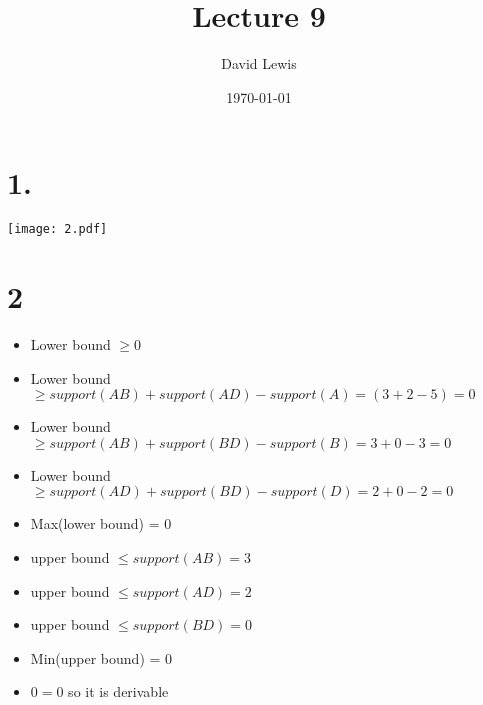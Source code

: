 \documentclass[11pt]{article}
\author{David Lewis}
\date{\today}
\title{Lecture 9}
\begin{document}
\maketitle

\section*{1.}
\label{sec:org9e97cb0}
\begin{center}
\texttt{[image: 2.pdf]}
\end{center}

\section*{2}
\label{sec:orgabe351b}
\begin{itemize}
\item Lower bound \(\ge 0\)
\item Lower bound \(\ge  support(AB) + support(AD) - support(A) = (3 + 2 - 5) = 0\)
\item Lower bound \(\ge support(AB) + support(BD) - support(B) = 3 + 0 -3 = 0\)
\item Lower bound \(\ge support(AD) + support(BD) - support(D) = 2 +0 - 2 = 0\)
\item Max(lower bound) = 0
\item upper bound \(\le support(AB) = 3\)
\item upper bound \(\le support(AD) = 2\)
\item upper bound \(\le support(BD) = 0\)
\item Min(upper bound) = 0
\item \(0 = 0\) so it is derivable
\end{itemize}
\end{document}

